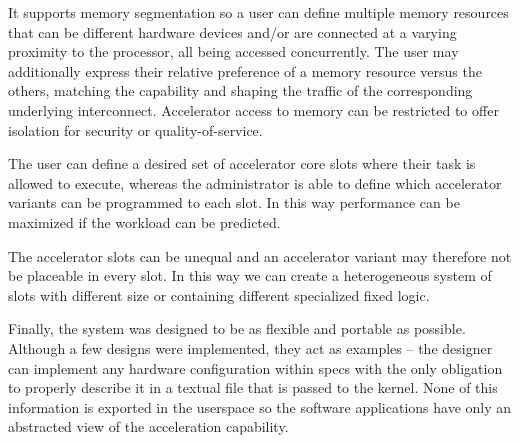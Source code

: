 It supports memory segmentation so a user can define multiple memory resources that can be
different hardware devices and/or are connected at a varying proximity to the processor, all being accessed concurrently.
The user may additionally express their relative preference of a memory resource versus the others,
matching the capability and shaping the traffic of the corresponding underlying interconnect.
Accelerator access to memory can be restricted to offer isolation for security or quality-of-service. 

The user can define a desired set of accelerator core slots where their task is allowed to execute,
whereas the administrator is able to define which accelerator variants can be programmed to each slot.
In this way performance can be maximized if the workload can be predicted.

The accelerator slots can be unequal and an accelerator variant may therefore not be placeable in every slot.
In this way we can create a heterogeneous system of slots with different size 
or containing different specialized fixed logic.

Finally, the system was designed to be as flexible and portable as possible.
Although a few designs were implemented, they act as examples --
the designer can implement any hardware configuration within specs
with the only obligation to properly describe it in a textual file that is passed to the kernel.
None of this information is exported in the userspace so the software applications have only
an abstracted view of the acceleration capability.

\vspace*{\fill}

